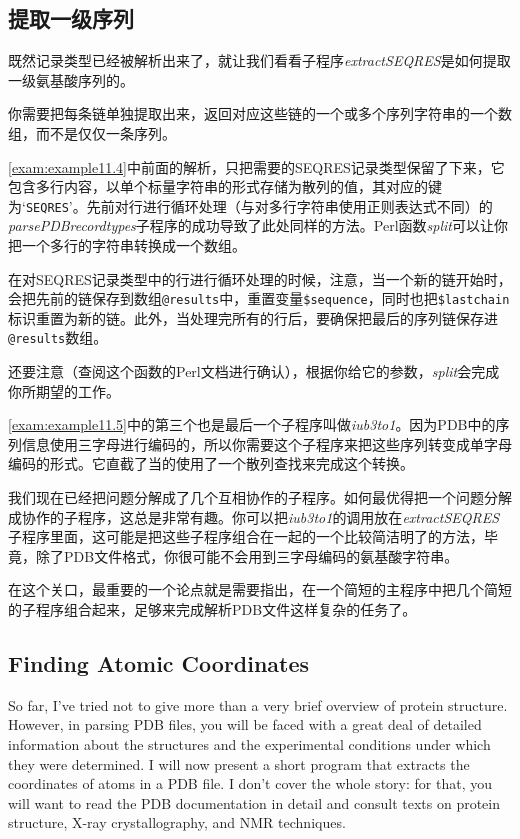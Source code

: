 \subsection{提取一级序列}
既然记录类型已经被解析出来了，就让我们看看子程序\textit{extractSEQRES}是如何提取一级氨基酸序列的。

你需要把每条链单独提取出来，返回对应这些链的一个或多个序列字符串的一个数组，而不是仅仅一条序列。

\autoref{exam:example11.4}中前面的解析，只把需要的SEQRES记录类型保留了下来，它包含多行内容，以单个标量字符串的形式存储为散列的值，其对应的键为`\verb|SEQRES|'。先前对行进行循环处理（与对多行字符串使用正则表达式不同）的\textit{parsePDBrecordtypes}子程序的成功导致了此处同样的方法。Perl函数\textit{split}可以让你把一个多行的字符串转换成一个数组。

在对SEQRES记录类型中的行进行循环处理的时候，注意，当一个新的链开始时，会把先前的链保存到数组\verb|@results|中，重置变量\verb|$sequence|，同时也把\verb|$lastchain|标识重置为新的链。此外，当处理完所有的行后，要确保把最后的序列链保存进\verb|@results|数组。

还要注意（查阅这个函数的Perl文档进行确认），根据你给它的参数，\textit{split}会完成你所期望的工作。

\autoref{exam:example11.5}中的第三个也是最后一个子程序叫做\textit{iub3to1}。因为PDB中的序列信息使用三字母进行编码的，所以你需要这个子程序来把这些序列转变成单字母编码的形式。它直截了当的使用了一个散列查找来完成这个转换。

我们现在已经把问题分解成了几个互相协作的子程序。如何最优得把一个问题分解成协作的子程序，这总是非常有趣。你可以把\textit{iub3to1}的调用放在\textit{extractSEQRES}子程序里面，这可能是把这些子程序组合在一起的一个比较简洁明了的方法，毕竟，除了PDB文件格式，你很可能不会用到三字母编码的氨基酸字符串。

在这个关口，最重要的一个论点就是需要指出，在一个简短的主程序中把几个简短的子程序组合起来，足够来完成解析PDB文件这样复杂的任务了。

\subsection{Finding Atomic Coordinates}
So far, I've tried not to give more than a very brief overview of protein structure. However, in parsing PDB files, you will be faced with a great deal of detailed information about the structures and the experimental conditions under which they were determined. I will now present a short program that extracts the coordinates of atoms in a PDB file. I don't cover the whole story: for that, you will want to read the PDB documentation in detail and consult texts on protein structure, X-ray crystallography, and NMR techniques.

